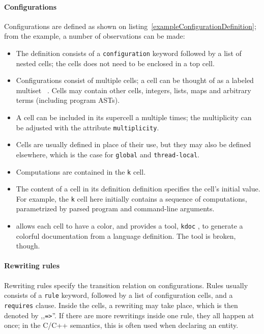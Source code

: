 \documentclass{fithesis3}
\newcommand{\kdoc}{\texttt{kdoc} }
\begin{document}
\paragraph{Configurations}
Configurations are defined as shown on listing~\ref{exampleConfigurationDefinition}; from the example, a number of observations can be made:
\begin{itemize}
\item The definition consists of a \texttt{configuration} keyword followed by a list of nested cells; the cells does not need to be enclosed in a top cell.
\item Configurations consist of multiple cells; a cell can be thought of as a labeled multiset ~\cite{hathhorn-ellison-rosu-2015-pldi}. Cells may contain other cells, integers, lists, maps and arbitrary terms (including program ASTs).
\item A cell can be included in its supercell a multiple times; the multiplicity can be adjusted with the attribute \texttt{multiplicity}.
\item Cells are usually defined in place of their use, but they may also be defined elsewhere, which is the case for \texttt{global} and \texttt{thread-local}.
\item Computations are contained in the \texttt{k} cell.
\item The content of a cell in its definition definition specifies the cell's initial value. For example, the \texttt{k} cell here initially contains a sequence of computations, parametrized by parsed program and command-line arguments.
\item \K allows each cell to have a color, and provides a tool, \kdoc , to generate a colorful documentation from a language definition. The tool is broken, though.
\end{itemize}


\paragraph{Rewriting rules}
Rewriting rules specify the transition relation on configurations. Rules usually consists of a \texttt{rule} keyword, followed by a list of configuration cells, and a \texttt{requires} clause. Inside the cells, a rewriting may take place, which is then denoted by ,,\lstinline{=>}''. If there are more rewritings inside one rule, they all happen at once; in the C/C++ semantics, this is often used when declaring an entity.
\end{document}
